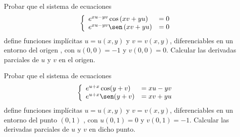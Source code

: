 \begin{ejercicio}
    Probar que el sistema de ecuaciones
    \begin{equation*}
        \left\{
            \begin{array}{ll}
                e^{xu-yv} \cos \left(xv+yu\right) &= 0 \\
                e^{xu-yv} \sen \left(xv+yu\right) &= 0 \\
            \end{array}
        \right.
    \end{equation*}
    define funciones implícitas $u = u(x, y)$ y $v = v(x, y)$, diferenciables en un entorno
    del origen , con $u(0, 0)=-1$ y $v(0, 0) = 0$. Calcular las derivadas parciales
    de $u$ y $v$ en el origen.
\end{ejercicio}



\begin{ejercicio}
    Probar que el sistema de ecuaciones
    \begin{equation*}
        \left\{
            \begin{array}{ll}
                e^{u+x} \cos(y+v) &=xu-yv \\
                e^{u+x} \sen(y+v) &= xv+yu
            \end{array}
        \right.
    \end{equation*}
    define funciones implícitas $u = u(x, y)$ y $v = v(x, y)$, diferenciables en un entorno
    del punto $(0,1)$ , con $u(0,1)=0$ y $v(0,1) = -1$. Calcular las derivadas parciales
    de $u$ y $v$ en dicho punto.
\end{ejercicio}